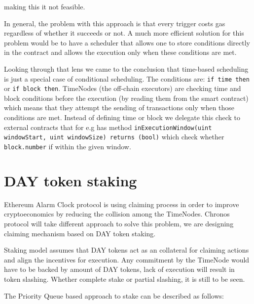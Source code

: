\documentclass{report}
\begin{document}
  making this it not feasible.

  In general, the problem with this approach is that every trigger costs gas regardless of whether it succeeds or not. A much more efficient solution for this problem would be to have a scheduler that allows one to store conditions directly in the contract and allows the execution only when these conditions are met.

  Looking through that lens we came to the conclusion that time-based scheduling is just a special case of conditional scheduling. The conditions are: \texttt{if time then} or \texttt{if block then}. TimeNodes (the off-chain executors) are checking time and block conditions before the execution (by reading them from the smart contract) which means that they attempt the sending of transactions only when those conditions are met. Instead of defining time or block we delegate this check to external contracts that for e.g has method \texttt{inExecutionWindow(uint windowStart, uint windowSize) returns (bool)} which check whether \texttt{block.number} if within the given window.

  \section{DAY token staking}

  Ethereum Alarm Clock protocol is using claiming process in order to improve cryptoeconomics by reducing the collision among the TimeNodes. Chronos protocol will take different approach to solve this problem, we are designing claiming mechanism based on DAY token staking.

  Staking model assumes that DAY tokens act as an collateral for claiming actions and align the incentives for execution. Any commitment by the TimeNode would have to be backed by amount of DAY tokens, lack of execution will result in token slashing. Whether complete stake or partial slashing, it is still to be seen.

  The Priority Queue based approach to stake can be described as follows:
\end{document}
